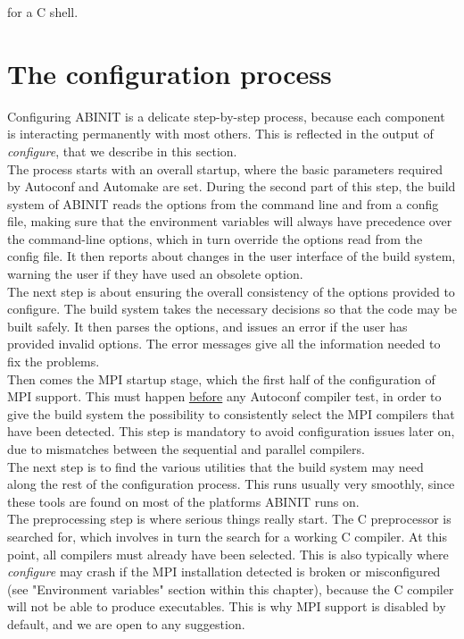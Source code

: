 for a C shell.

\section{The configuration process}

Configuring ABINIT is a delicate step-by-step process, because each
component is interacting permanently with most others. This is reflected
in the output of \textit{configure}, that we describe in this section.
\\

The process starts with an overall startup, where the basic parameters
required by Autoconf and Automake are set. During the second part of
this step, the build system of ABINIT reads the options from the command
line and from a config file, making sure that the environment variables
will always have precedence over the command-line options, which in turn
override the options read from the config file. It then reports about
changes in the user interface of the build system, warning the user if
they have used an obsolete option.
\\

The next step is about ensuring the overall consistency of the options
provided to configure. The build system takes the necessary decisions so
that the code may be built safely. It then parses the options, and
issues an error if the user has provided invalid options. The error
messages give all the information needed to fix the problems.
\\

Then comes the MPI startup stage, which the first half of the
configuration of MPI support. This must happen \underline{before} any
Autoconf compiler test, in order to give the build system the
possibility to consistently select the MPI compilers that have been
detected. This step is mandatory to avoid configuration issues later on,
due to mismatches between the sequential and parallel compilers.
\\

The next step is to find the various utilities that the build system may
need along the rest of the configuration process. This runs usually very
smoothly, since these tools are found on most of the platforms ABINIT
runs on.
\\

The preprocessing step is where serious things really start. The C
preprocessor is searched for, which involves in turn the search for a
working C compiler. At this point, all compilers must already have been
selected. This is also typically where \textit{configure} may crash if
the MPI installation detected is broken or misconfigured (see
"Environment variables" section within this chapter), because the C
compiler will not be able to produce executables. This is why MPI
support is disabled by default, and we are open to any suggestion.
\\

